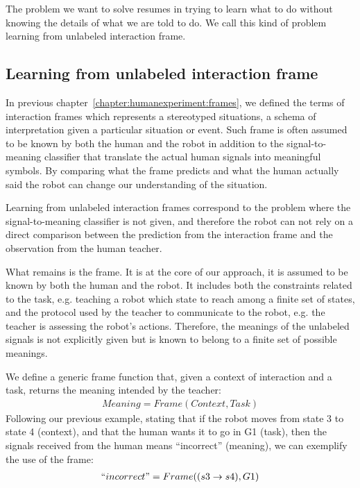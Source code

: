 The problem we want to solve resumes in trying to learn what to do without knowing the details of what we are told to do. We call this kind of problem learning from unlabeled interaction frame. 

\subsection{Learning from unlabeled interaction frame}

In previous chapter~\ref{chapter:humanexperiment:frames}, we defined the terms of interaction frames which represents a stereotyped situations, a schema of interpretation given a particular situation or event. Such frame is often assumed to be known by both the human and the robot in addition to the signal-to-meaning classifier that translate the actual human signals into meaningful symbols. By comparing what the frame predicts and what the human actually said the robot can change our understanding of the situation.

Learning from unlabeled interaction frames correspond to the problem where the signal-to-meaning classifier is not given, and therefore the robot can not rely on a direct comparison between the prediction from the interaction frame and the observation from the human teacher. 

What remains is the frame. It is at the core of our approach, it is assumed to be known by both the human and the robot. It includes both the constraints related to the task, e.g. teaching a robot which state to reach among a finite set of states, and the protocol used by the teacher to communicate to the robot, e.g. the teacher is assessing the robot's actions. Therefore, the meanings of the unlabeled signals is not explicitly given but is known to belong to a finite set of possible meanings.

We define a generic frame function that, given a context of interaction and a task, returns the meaning intended by the teacher:
%
\begin{eqnarray}
Meaning = Frame(Context, Task)
\end{eqnarray}
%
Following our previous example, stating that if the robot moves from state 3 to state 4 (context), and that the human wants it to go in G1 (task), then the signals received from the human means ``incorrect'' (meaning), we can exemplify the use of the frame:
%
\begin{eqnarray}
``incorrect" = Frame((s3 \rightarrow s4), G1)
\end{eqnarray}

